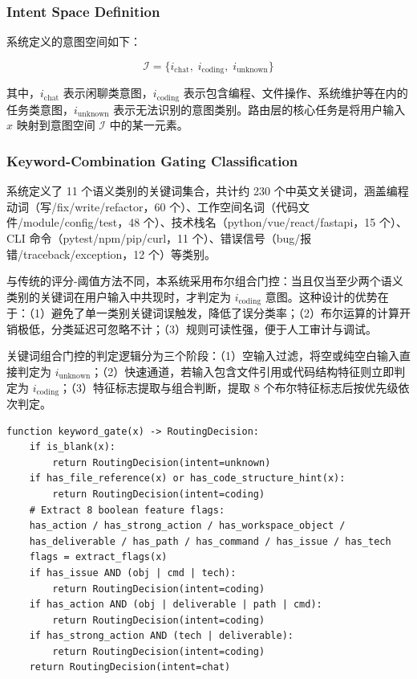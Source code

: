 \subsubsection{Intent Space Definition}

系统定义的意图空间如下：

\begin{equation}
\mathcal{I} = \{i_{\text{chat}},\; i_{\text{coding}},\; i_{\text{unknown}}\}
\end{equation}

其中，$i_{\text{chat}}$ 表示闲聊类意图，$i_{\text{coding}}$ 表示包含编程、文件操作、系统维护等在内的任务类意图，$i_{\text{unknown}}$ 表示无法识别的意图类别。路由层的核心任务是将用户输入 $x$ 映射到意图空间 $\mathcal{I}$ 中的某一元素。

\subsubsection{Keyword-Combination Gating Classification}

系统定义了 11 个语义类别的关键词集合，共计约 230 个中英文关键词，涵盖编程动词（写/fix/write/refactor，60 个）、工作空间名词（代码文件/module/config/test，48 个）、技术栈名（python/vue/react/fastapi，15 个）、CLI 命令（pytest/npm/pip/curl，11 个）、错误信号（bug/报错/traceback/exception，12 个）等类别。

与传统的评分-阈值方法不同，本系统采用布尔组合门控：当且仅当至少两个语义类别的关键词在用户输入中共现时，才判定为 $i_{\text{coding}}$ 意图。这种设计的优势在于：（1）避免了单一类别关键词误触发，降低了误分类率；（2）布尔运算的计算开销极低，分类延迟可忽略不计；（3）规则可读性强，便于人工审计与调试。

关键词组合门控的判定逻辑分为三个阶段：（1）空输入过滤，将空或纯空白输入直接判定为 $i_{\text{unknown}}$；（2）快速通道，若输入包含文件引用或代码结构特征则立即判定为 $i_{\text{coding}}$；（3）特征标志提取与组合判断，提取 8 个布尔特征标志后按优先级依次判定。

\begin{lstlisting}[caption={关键词组合门控伪代码}, label={lst:keyword-gate}, basicstyle=\small\ttfamily, frame=single, breaklines=true]
function keyword_gate(x) -> RoutingDecision:
    if is_blank(x):
        return RoutingDecision(intent=unknown)
    if has_file_reference(x) or has_code_structure_hint(x):
        return RoutingDecision(intent=coding)
    # Extract 8 boolean feature flags:
    has_action / has_strong_action / has_workspace_object /
    has_deliverable / has_path / has_command / has_issue / has_tech
    flags = extract_flags(x)
    if has_issue AND (obj | cmd | tech):
        return RoutingDecision(intent=coding)
    if has_action AND (obj | deliverable | path | cmd):
        return RoutingDecision(intent=coding)
    if has_strong_action AND (tech | deliverable):
        return RoutingDecision(intent=coding)
    return RoutingDecision(intent=chat)
\end{lstlisting}

